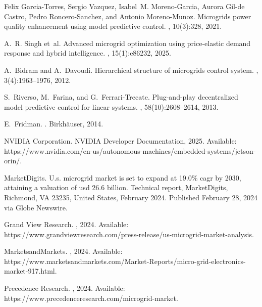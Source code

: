 \documentclass[12pt]{article}
\begin{document}
\begin{thebibliography}{10}
Felix Garcia-Torres, Sergio Vazquez, Isabel~M. Moreno-Garcia, Aurora Gil-de
  Castro, Pedro Roncero-Sanchez, and Antonio Moreno-Munoz.
\newblock Microgrids power quality enhancement using model predictive control.
, 10(3):328, 2021.

A.~R. Singh et~al.
\newblock Advanced microgrid optimization using price-elastic demand response
  and hybrid intelligence.
, 15(1):e86232, 2025.

A.~Bidram and A.~Davoudi.
\newblock Hierarchical structure of microgrids control system.
, 3(4):1963--1976, 2012.

S.~Riverso, M.~Farina, and G.~Ferrari-Trecate.
\newblock Plug-and-play decentralized model predictive control for linear
  systems.
, 58(10):2608--2614,
  2013.

E.~Fridman.
.
\newblock Birkhäuser, 2014.

{NVIDIA Corporation}.
\newblock NVIDIA Developer Documentation, 2025.
\newblock Available:
  https://www.nvidia.com/en-us/autonomous-machines/embedded-systems/jetson-orin/.

{MarketDigits}.
\newblock U.s. microgrid market is set to expand at 19.0\% cagr by 2030,
  attaining a valuation of usd 26.6 billion.
\newblock Technical report, MarketDigits, Richmond, VA 23235, United States,
  February 2024.
\newblock Published February 28, 2024 via Globe Newswire.

{Grand View Research}.
, 2024.
\newblock Available:
  https://www.grandviewresearch.com/press-release/us-microgrid-market-analysis.

{MarketsandMarkets}.
, 2024.
\newblock Available:
  https://www.marketsandmarkets.com/Market-Reports/micro-grid-electronics-market-917.html.

{Precedence Research}.
, 2024.
\newblock Available: https://www.precedenceresearch.com/microgrid-market.


\end{thebibliography}
\end{document}
